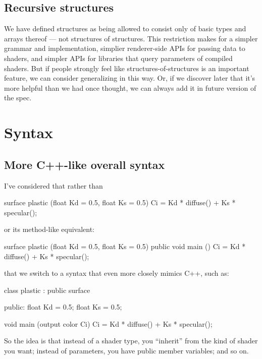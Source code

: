 \documentclass[11pt,letterpaper]{book}
\begin{document}
\begin{annotate}
\subsection{Recursive structures}

We have defined structures as being allowed to consist only of basic
types and arrays thereof --- not structures of structures.  This
restriction makes for a simpler grammar and implementation, simplier
renderer-side APIs for passing data to shaders, and simpler APIs for
libraries that query parameters of compiled shaders.  But if people
strongly feel like structures-of-structures is an important feature, we
can consider generalizing in this way.  Or, if we discover later that
it's more helpful than we had once thought, we can always add it in
future version of the spec.


\section{Syntax}

\subsection{More C++-like overall syntax}

I've considered that rather than 

\begin{code}
    surface plastic (float Kd = 0.5, float Ks = 0.5)
    {
        Ci = Kd * diffuse() + Ks * specular();
    }
\end{code}

\noindent or its method-like equivalent:

\begin{code}
    surface plastic (float Kd = 0.5, float Ks = 0.5)
    {
        public void main () {
            Ci = Kd * diffuse() + Ks * specular();
        }
    }
\end{code}

\noindent that we switch to a syntax that even more closely mimics C++,
such as:

\begin{code}
    class plastic : public surface
    {
    public:
        float Kd = 0.5;
        float Ks = 0.5;

        void main (output color Ci) {
            Ci = Kd * diffuse() + Ks * specular();
        }
    }
\end{code}

So the idea is that instead of a shader type, you ``inherit'' from the
kind of shader you want; instead of parameters, you have public member
variables; and so on.


\end{annotate}
\end{document}
